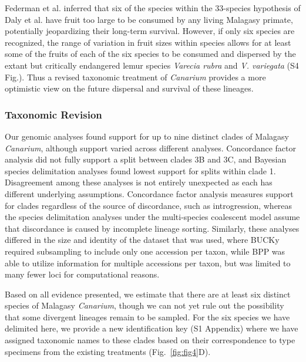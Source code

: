 \documentclass[10pt,letterpaper]{article}
\begin{document}
Federman et al. \cite{federman_implications_2016} inferred that six of the species within the 33-species hypothesis of Daly et al. \cite{daly_revision_2015} have fruit too large to be consumed by any living Malagasy primate, potentially jeopardizing their long-term survival. However, if only six species are recognized, the range of variation in fruit sizes within species allows for at least some of the fruits of each of the six species to be consumed and dispersed by the extant but critically endangered lemur species \emph{Varecia rubra} and \emph{V. variegata} (S4 Fig.). %
Thus a revised taxonomic treatment of \emph{Canarium} provides a more optimistic view on the future dispersal and survival of these lineages. 

\subsubsection*{Taxonomic Revision}
Our genomic analyses found support for up to nine distinct clades of Malagasy \emph{Canarium}, although support varied across different analyses. Concordance factor analysis did not fully support a split between clades 3B and 3C, and Bayesian species delimitation analyses found lowest support for splits within clade 1. Disagreement among these analyses is not entirely unexpected as each has different underlying assumptions. Concordance factor analysis measures support for clades regardless of the source of discordance, such as introgression, whereas the species delimitation analyses under the multi-species coalescent model assume that discordance is caused by incomplete lineage sorting. Similarly, these analyses differed in the size and identity of the dataset that was used, where BUCKy required subsampling to include only one accession per taxon, while BPP was able to utilize information for multiple accessions per taxon, but was limited to many fewer loci for computational reasons. 

Based on all evidence presented, we estimate that there are at least six distinct species of Malagasy \emph{Canarium}, though we can not yet rule out the possibility that some divergent lineages remain to be sampled. For the six species we have delimited here, we provide a new identification key (S1 Appendix) where we have assigned taxonomic names to these clades based on their correspondence to type specimens from the existing treatments (Fig.~\ref{fig:fig4}D). 
\end{document}

